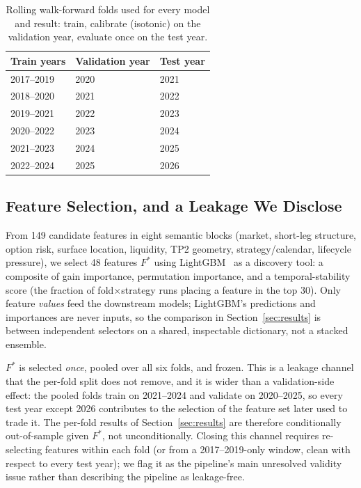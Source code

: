 \documentclass[sigconf,review,anonymous]{acmart}
\begin{document}
\begin{table}[t]
\centering
\footnotesize
\begin{tabular}{lll}
\toprule
Train years & Validation year & Test year \\
\midrule
2017--2019 & 2020 & 2021 \\
2018--2020 & 2021 & 2022 \\
2019--2021 & 2022 & 2023 \\
2020--2022 & 2023 & 2024 \\
2021--2023 & 2024 & 2025 \\
2022--2024 & 2025 & 2026 \\
\bottomrule
\end{tabular}
\caption{Rolling walk-forward folds used for every model and result: train, calibrate (isotonic) on the validation year, evaluate once on the test year.}
\label{tab:folds}
\end{table}

\subsection{Feature Selection, and a Leakage We Disclose}
\label{sec:features}
From 149 candidate features in eight semantic blocks (market, short-leg structure, option risk, surface location, liquidity, TP2 geometry, strategy/calendar, lifecycle pressure), we select 48 features $F^{\ast}$ using LightGBM~\cite{ke2017lightgbm} as a discovery tool: a composite of gain importance, permutation importance, and a temporal-stability score (the fraction of fold$\times$strategy runs placing a feature in the top 30). Only feature \emph{values} feed the downstream models; LightGBM's predictions and importances are never inputs, so the comparison in Section~\ref{sec:results} is between independent selectors on a shared, inspectable dictionary, not a stacked ensemble.

$F^{\ast}$ is selected \emph{once}, pooled over all six folds, and frozen. This is a leakage channel that the per-fold split does not remove, and it is wider than a validation-side effect: the pooled folds train on 2021--2024 and validate on 2020--2025, so every test year except 2026 contributes to the selection of the feature set later used to trade it. The per-fold results of Section~\ref{sec:results} are therefore conditionally out-of-sample given $F^{\ast}$, not unconditionally. Closing this channel requires re-selecting features within each fold (or from a 2017--2019-only window, clean with respect to every test year); we flag it as the pipeline's main unresolved validity issue rather than describing the pipeline as leakage-free.
\end{document}
